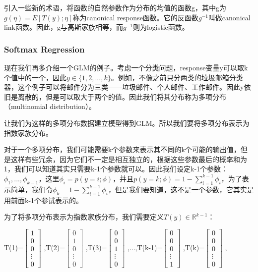 \documentclass[UTF8]{ctexart}
\begin{document}
引入一些新的术语，将函数的自然参数作为分布的均值的函数g，其中g为$g(\eta)=E[T(y);\eta]$称为canonical response函数。它的反函数$g^{-1}$叫做canonical link函数。因此，g与高斯家族相等，而$g^{-1}$则为logistic函数。

\subsubsection{Softmax Regression}


现在我们再多介绍一个GLM的例子。考虑一个分类问题，response变量y可以取k个值中的一个，因此$y\in \{1,2,...,k \}$。例如，不像之前只分两类的垃圾邮箱分类器，这个例子可以将邮件分为三类——垃圾邮件、个人邮件、工作邮件。因此y依旧是离散的，但是可以取大于两个的值。因此我们将其分布称为多项分布（multinomial distribution）。

让我们为这样的多项分布数据建立模型得到GLM。所以我们要将多项分布表示为指数家族分布。

对于一个多项分布，我们可能需要k个参数来表示其不同的k个可能的输出值，但是这样有些冗余，因为它们不一定是相互独立的，根据这些参数最后的概率和为1，我们可以知道其实只需要k-1个参数就可以。因此我们设定k-1个参数：$\phi_{1},...,\phi_{k-1}$，这里$\phi_{i}=p(y=i;\phi)$，并且$p(y=k;\phi)=1-\sum_{i=1}^{k-1}\phi_{i}$，为了表示简单，我们令$\phi_{k}=1-\sum_{i=1}^{k-1}\phi_{i}$，但是我们要知道，这不是一个参数，它其实是用前面k-1个参试表示的。

为了将多项分布表示为指数家族分布，我们需要定义$T(y) \in \mathbb{R}^{k-1}$：

T(1)=$\begin{bmatrix} 1\\ 0\\ 0\\ \vdots \\0 \end{bmatrix}$ ,T(2)=$\begin{bmatrix} 0\\ 1\\ 0\\ \vdots \\0 \end{bmatrix}$ ,T(3)=$\begin{bmatrix} 0\\ 0\\ 1\\ \vdots \\0 \end{bmatrix}$ ,...,T(k-1)=$\begin{bmatrix} 0\\ 0\\ 0\\ \vdots \\1 \end{bmatrix}$ ,T(k)=$\begin{bmatrix} 0\\ 0\\ 0\\ \vdots \\0 \end{bmatrix}$ ,
\end{document}
